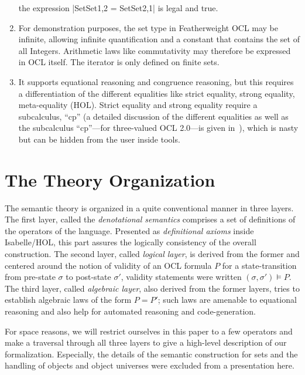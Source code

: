 \begin{enumerate}
  the expression
  \inlineocl|Set{Set{1,2}} = Set{Set{2,1}}| is legal and true.
\item For demonstration purposes, the set type in Featherweight OCL
  may be infinite, allowing infinite quantification and a constant
  that contains the set of all Integers.  Arithmetic laws like
  commutativity may therefore be expressed in OCL itself.  The
  iterator is only defined on finite sets.
\item It supports equational reasoning and congruence reasoning, but
  this requires a differentiation of the different equalities like
  strict equality, strong equality, meta-equality (HOL). Strict
  equality and strong equality require a subcalculus, ``cp'' (a
  detailed discussion of the different equalities as well as the
  subcalculus ``cp''---for three-valued OCL 2.0---is given
  in~\cite{brucker.ea:semantics:2009}), which is nasty but can be
  hidden from the user inside tools.
\end{enumerate}

\section{The Theory Organization}
The semantic theory is organized in a quite conventional manner in
three layers. The first layer, called the \emph{denotational
  semantics} comprises a set of definitions of the operators of the
language.  Presented as \emph{definitional axioms} inside
Isabelle/HOL, this part assures the logically consistency of the
overall construction. The second layer, called \emph{logical layer},
is derived from the former and centered around the notion of validity
of an OCL formula $P$ for a state-transition from pre-state $\sigma$
to post-state $\sigma'$, validity statements were written $(\sigma,
\sigma') \models P$.  The third layer, called \emph{algebraic layer},
also derived from the former layers, tries to establish algebraic laws
of the form $P = P'$; such laws are amenable to equational reasoning
and also help for automated reasoning and code-generation.

For space reasons, we will restrict ourselves in this paper to a few
operators and make a traversal through all three layers to give a
high-level description of our formalization.  Especially, the details
of the semantic construction for sets and the handling of objects and
object universes were excluded from a presentation here.


